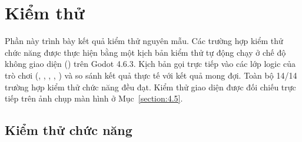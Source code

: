 \documentclass[../DoAn.tex]{subfiles}
\begin{document}
\section{Kiểm thử}
\label{section:4.7}

Phần này trình bày kết quả kiểm thử nguyên mẫu. Các trường hợp kiểm thử chức năng được thực hiện bằng một kịch bản kiểm thử tự động chạy ở chế độ không giao diện () trên Godot 4.6.3. Kịch bản gọi trực tiếp vào các lớp logic của trò chơi (, , , , ) và so sánh kết quả thực tế với kết quả mong đợi. Toàn bộ 14/14 trường hợp kiểm thử chức năng đều đạt. Kiểm thử giao diện được đối chiếu trực tiếp trên ảnh chụp màn hình ở Mục~\ref{section:4.5}.

\subsection{Kiểm thử chức năng}
\end{document}
